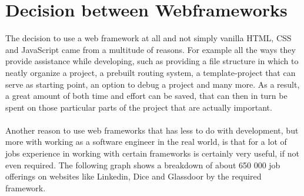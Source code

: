 \section{Decision between Webframeworks}
The decision to use a web framework at all and not simply vanilla HTML, CSS and JavaScript came from a multitude of reasons.
For example all the ways they provide assistance while developing, such as providing a file structure in which to neatly 
organize a project, a prebuilt routing system, a template-project that can serve as starting point, an option to debug a 
project and many more. As a result, a great amount of both time and effort can be saved, that can then in turn be spent on 
those particular parts of the project that are actually important.
\\
\\
Another reason to use web frameworks that has less to do with development, but more with working as a software engineer in 
the real world, is that for a lot of jobs experience in working with certain frameworks is certainly very useful, if not 
even required. The following graph shows a breakdown of about 650 000 job offerings on websites like Linkedin, 
Dice and Glassdoor by the required framework. \cite{WebframeworkJobs}
\\
\\
